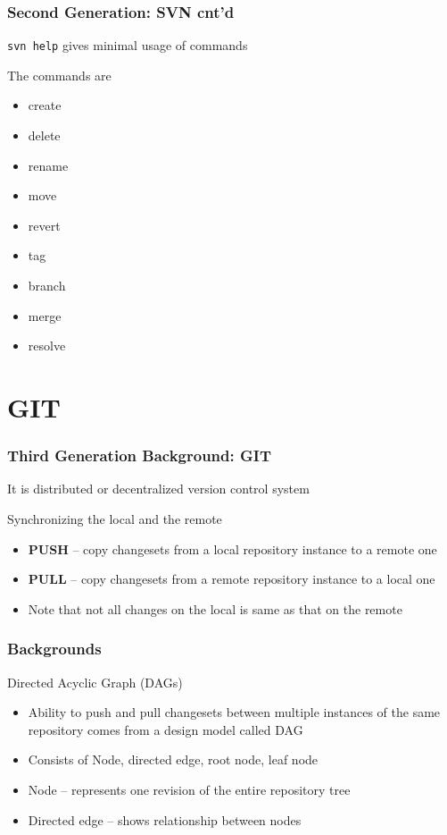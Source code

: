 \documentclass[newPxFont,sthlmFooter,nooffset]{beamer}
\begin{document}
\begin{frame}[t]
  \frametitle{Second Generation: SVN cnt'd}
\texttt{svn help} gives minimal usage of commands

The commands are 

\begin{itemize}
\item create
\item delete
\item rename
\item move
\item revert
\item tag
\item branch
\item merge
\item resolve
\end{itemize}

\end{frame}


\section{GIT}



\begin{frame}[t]
  \frametitle{Third Generation Background: GIT}
It is distributed or decentralized version control system

Synchronizing the local and the remote
\begin{itemize}
\item \textbf{PUSH} – copy changesets from a local repository instance to a remote one
\item \textbf{PULL} – copy changesets from a remote repository instance to a local one
\item Note that not all changes on the local is same as that on the remote
\end{itemize}


\end{frame}



\begin{frame}[t]
  \frametitle{Backgrounds}
Directed Acyclic Graph (DAGs)
\begin{itemize}
\item Ability to push and pull changesets between multiple instances of the same repository comes from a design model called DAG
\item Consists of Node, directed edge, root node, leaf node
\item Node – represents one revision of the entire repository tree
\item Directed edge – shows relationship between nodes
\end{itemize}
\end{frame}
\end{document}
